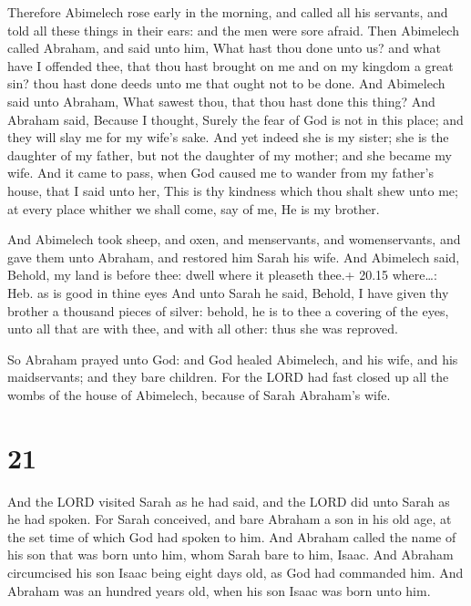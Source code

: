  Therefore Abimelech rose early in the morning, and called
all his servants, and told all these things in their ears: and the men
were sore afraid.  Then Abimelech called Abraham, and said
unto him, What hast thou done unto us? and what have I offended thee,
that thou hast brought on me and on my kingdom a great sin? thou hast
done deeds unto me that ought not to be done.  And
Abimelech said unto Abraham, What sawest thou, that thou hast done this
thing?  And Abraham said, Because I thought, Surely the
fear of God is not in this place; and they will slay me for my wife's
sake.  And yet indeed she is my sister; she is the daughter
of my father, but not the daughter of my mother; and she became my wife.
 And it came to pass, when God caused me to wander from my
father's house, that I said unto her, This is thy kindness which thou
shalt shew unto me; at every place whither we shall come, say of me, He
is my brother.

 And Abimelech took sheep, and oxen, and menservants, and
womenservants, and gave them unto Abraham, and restored him Sarah his
wife.  And Abimelech said, Behold, my land is before thee:
dwell where it pleaseth thee.+ 20.15 where\ldots: Heb. as is good in
thine eyes  And unto Sarah he said, Behold, I have given
thy brother a thousand pieces of silver: behold, he is to thee a
covering of the eyes, unto all that are with thee, and with all other:
thus she was reproved.

 So Abraham prayed unto God: and God healed Abimelech,
and his wife, and his maidservants; and they bare children.
 For the LORD had fast closed up all the wombs of the house
of Abimelech, because of Sarah Abraham's wife.

\hypertarget{section-20}{%
\section{21}\label{section-20}}

 And the LORD visited Sarah as he had said, and the LORD did
unto Sarah as he had spoken.  For Sarah conceived, and bare
Abraham a son in his old age, at the set time of which God had spoken to
him.  And Abraham called the name of his son that was born
unto him, whom Sarah bare to him, Isaac.  And Abraham
circumcised his son Isaac being eight days old, as God had commanded
him.  And Abraham was an hundred years old, when his son
Isaac was born unto him.

